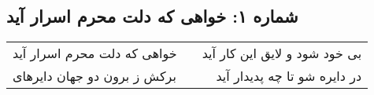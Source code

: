 \begin{center}
\section*{شماره ۱: خواهی که دلت محرم اسرار آید}
\label{sec:001}
\begin{longtable}{l p{0.5cm} r}
خواهی که دلت محرم اسرار آید
&&
بی خود شود و لایق این کار آید
\\
برکش ز برون دو جهان دایرهای
&&
در دایره شو تا چه پدیدار آید
\\
\end{longtable}
\end{center}
